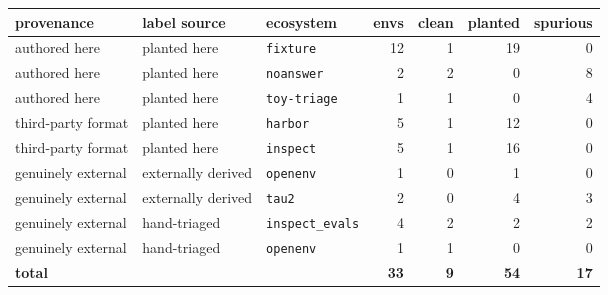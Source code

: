 \begin{tabular}{@{}lllrrrr@{}}
\toprule
provenance & label source & ecosystem & envs & clean & planted & spurious \\
\midrule
authored here & planted here & \texttt{fixture} & 12 & 1 & 19 & 0 \\
authored here & planted here & \texttt{noanswer} & 2 & 2 & 0 & 8 \\
authored here & planted here & \texttt{toy-triage} & 1 & 1 & 0 & 4 \\
third-party format & planted here & \texttt{harbor} & 5 & 1 & 12 & 0 \\
third-party format & planted here & \texttt{inspect} & 5 & 1 & 16 & 0 \\
genuinely external & externally derived & \texttt{openenv} & 1 & 0 & 1 & 0 \\
genuinely external & externally derived & \texttt{tau2} & 2 & 0 & 4 & 3 \\
genuinely external & hand-triaged & \texttt{inspect\_evals} & 4 & 2 & 2 & 2 \\
genuinely external & hand-triaged & \texttt{openenv} & 1 & 1 & 0 & 0 \\
\midrule
\textbf{total} & & & \textbf{33} & \textbf{9} & \textbf{54} & \textbf{17} \\
\bottomrule
\end{tabular}
